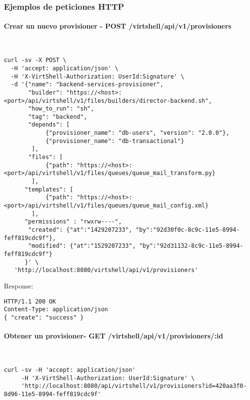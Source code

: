 \subsubsection{Ejemplos de peticiones HTTP}

\paragraph{Crear un nuevo provisioner - POST /virtshell/api/v1/provisioners} ~\\


\begin{lstlisting}[style=json]
curl -sv -X POST \
  -H 'accept: application/json' \
  -H 'X-VirtShell-Authorization: UserId:Signature' \
  -d '{"name": "backend-services-provisioner",
       "builder": "https://<host>:<port>/api/virtshell/v1/files/builders/director-backend.sh",
       "how_to_run": "sh",
       "tag": "backend",
       "depends": [
            {"provisioner_name": "db-users", "version": "2.0.0"},
            {"provisioner_name": "db-transactional"}
        ],
       "files": [
            {"path": "https://<host>:<port>/api/virtshell/v1/files/queues/queue_mail_transform.py}
        ],
      "templates": [
            {"path": "https://<host>:<port>/api/virtshell/v1/files/queues/queue_mail_config.xml}
        ],
      "permissions" : "rwxrw----",       
       "created": {"at":"1429207233", "by":"92d30f0c-8c9c-11e5-8994-feff819cdc9f"},
       "modified": {"at":"1529207233", "by":"92d31132-8c9c-11e5-8994-feff819cdc9f"}
      }' \
   'http://localhost:8080/virtshell/api/v1/provisioners'
\end{lstlisting}

Response:

\begin{lstlisting}[style=json]
HTTP/1.1 200 OK
Content-Type: application/json
{ "create": "success" }
\end{lstlisting}

\paragraph{Obtener un provisioner- GET /virtshell/api/v1/provisioners/:id} ~\\

\begin{lstlisting}[style=json]
curl -sv -H 'accept: application/json' 
     -H 'X-VirtShell-Authorization: UserId:Signature' \ 
     'http://localhost:8080/api/virtshell/v1/provisioners?id=420aa3f0-8d96-11e5-8994-feff819cdc9f'
\end{lstlisting}

